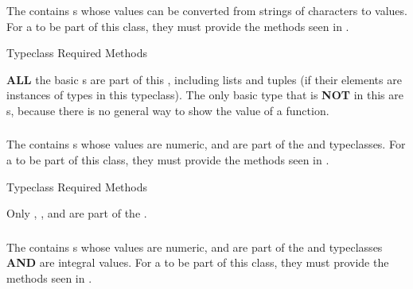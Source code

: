 \subsubsection{\texorpdfstring{}{\texttt{Read}}}\label{subsubsec:Read_Typeclass}
The   contains s whose values can be converted from strings of characters to values.
For a  to be part of this class, they must provide the methods seen in .

\begin{listing}[h!tbp]
\caption{ Typeclass Required Methods}
\label{lst:Read_Typeclass_Methods}
\end{listing}

\textbf{ALL} the basic s are part of this , including lists and tuples (if their elements are instances of types in this typeclass).
The only basic type that is \textbf{NOT} in this  are s, because there is no general way to show the value of a function.

\subsubsection{\texorpdfstring{}{\texttt{Num}}}\label{subsubsec:Num_Typeclass}
The   contains s whose values are numeric, and are part of the  and  typeclasses.
For a  to be part of this class, they must provide the methods seen in .

\begin{listing}[h!tbp]
\caption{ Typeclass Required Methods}
\label{lst:Num_Typeclass_Methods}
\end{listing}

Only , , and  are part of the  .

\subsubsection{\texorpdfstring{}{\texttt{Integral}}}\label{subsubsec:Integral_Typeclass}
The   contains s whose values are numeric, and are part of the  and  typeclasses \textbf{AND} are integral values.
For a  to be part of this class, they must provide the methods seen in .

